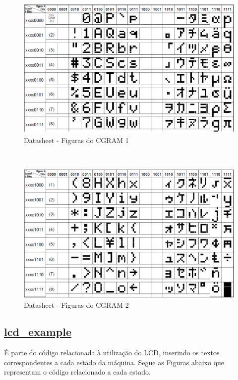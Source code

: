 \documentclass[14pt, oneside]{book}
\newcommand\tab[1][1cm]{\hspace*{#1}}
\theoremstyle{definition}
\begin{document}
                \begin{figure}[H]
                    \centering
                    \includegraphics[scale=0.8]{lcd4.png}
                    \caption{Datasheet - Figuras do CGRAM 1}
                    \label{lcd4}
                \end{figure} \\
                
                \begin{figure}[H]
                    \centering
                    \includegraphics[scale=0.8]{lcd5.png}
                    \caption{Datasheet - Figuras do CGRAM 2}
                    \label{lcd5}
                \end{figure}
                
                
                \subsection[lcd\_example]{\hyperlink{toc}{lcd\_example}}
                \tab É parte do código relacionada à utilização do LCD, inserindo os textos correspondentes a cada estado da máquina. Segue as Figuras abaixo que representam o código relacionado a cada estado.
                
\end{document}
